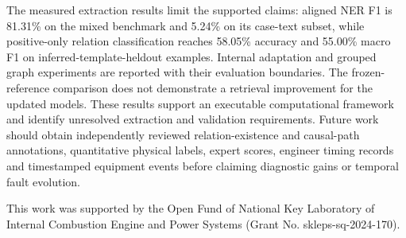 \documentclass[
aps,%
12pt,%
final,%
notitlepage,%
oneside,%
onecolumn,%
nobibnotes,%
nofootinbib,%
superscriptaddress,%
noshowpacs,%
centertags]%
{revtex4}
\begin{document}
The measured extraction results limit the supported claims: aligned NER F1 is 81.31\% on the mixed benchmark and 5.24\% on its case-text subset, while positive-only relation classification reaches 58.05\% accuracy and 55.00\% macro F1 on inferred-template-heldout examples. Internal adaptation and grouped graph experiments are reported with their evaluation boundaries. The frozen-reference comparison does not demonstrate a retrieval improvement for the updated models. These results support an executable computational framework and identify unresolved extraction and validation requirements. Future work should obtain independently reviewed relation-existence and causal-path annotations, quantitative physical labels, expert scores, engineer timing records and timestamped equipment events before claiming diagnostic gains or temporal fault evolution.
\begin{acknowledgments}
This work was supported by the Open Fund of National Key Laboratory of Internal Combustion Engine and Power Systems (Grant No. skleps-sq-2024-170).
\end{acknowledgments}



\end{document}
